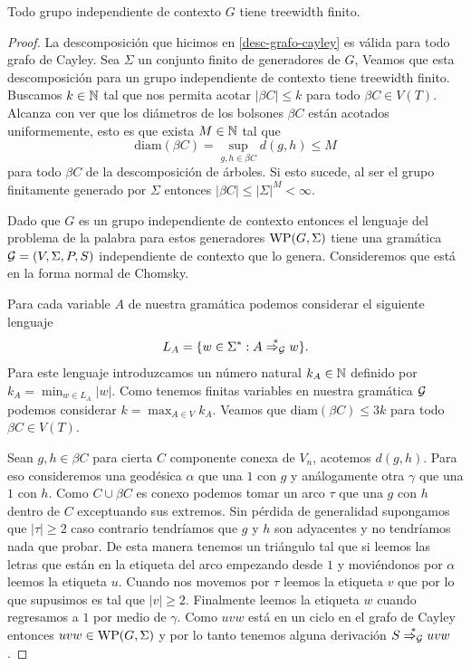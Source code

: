 \documentclass[tesis.tex]{subfiles}
\begin{document}
\begin{teo} \label{teo_Mul-Sch}\cite{muller1985theory}
	Todo grupo independiente de contexto $G$ tiene treewidth finito.
\end{teo}
\begin{proof}
	La descomposición que hicimos en \ref{desc-grafo-cayley} es válida para todo grafo de Cayley.
	Sea $\Sigma$ un conjunto finito de generadores de $G$, 
	Veamos que esta descomposición para un grupo independiente de contexto tiene treewidth finito. 
	Buscamos $k \in \mathbb{N}$ tal que nos permita acotar $|\beta C| \le k$ para todo $\beta C \in V(T)$. 
	Alcanza con ver que los diámetros de los bolsones $\beta C$ están acotados uniformemente, 
	esto es que exista $M \in \mathbb{N}$ tal que 
	\[
	\text{diam}(\beta C) =  \sup_{g,h \in \beta C} d(g,h) \le M
	\] 
	para todo $\beta C$ de la descomposición de árboles.
	Si esto sucede, al ser el grupo finitamente generado por $\Sigma$ entonces $|\beta C| \le |\Sigma|^{M} < \infty$.
	
	
	Dado que $G$ es un grupo independiente de contexto entonces el lenguaje del problema de la palabra para estos generadores $\text{WP}(G, \Sigma)$ tiene una gramática $ {\cal G} = (V, \Sigma, P, S)$ independiente de contexto que lo genera. 
	Consideremos que está en la forma normal de Chomsky.
	
	Para cada variable $A$ de nuestra gramática podemos considerar el siguiente lenguaje
	\[
	L_A = \{ w \in \Sigma^* : A \overset{*}{\Rightarrow_{\cal G}} w  \}.
	\]
	Para este lenguaje introduzcamos un número natural $k_A \in \mathbb{N}$ definido por $k_A = {\min}_{w \in L_A} |w|$. 
	Como tenemos finitas variables en nuestra gramática $\cal G$ podemos considerar $k = \max_{A \in V} k_A$. 
	Veamos que $\text{diam}(\beta C) \le 3k$ para todo $\beta C \in V(T)$.
	
	Sean $g,h \in \beta C$ para cierta $C$ componente conexa de $V_n$, acotemos $d(g,h)$. 
	Para eso consideremos una geodésica $\alpha$ que una $1$ con $g$ y análogamente otra $\gamma$ que una $1$ con $h$. 
	Como $C \cup \beta C$ es conexo podemos tomar un arco $\tau$ que una $g$ con  $h$ dentro de $C$ exceptuando sus extremos. 
	Sin pérdida de generalidad supongamos que $|\tau| \ge 2$ caso contrario tendríamos que $g$ y $h$ son adyacentes y no tendríamos nada que probar.
	De esta manera tenemos un triángulo tal que si leemos las letras que están en la etiqueta del arco empezando desde $1$ y moviéndonos por $\alpha$ leemos la etiqueta $u$. 
	Cuando nos movemos por $\tau$ leemos la etiqueta $v$ que por lo que supusimos es tal que $|v| \ge 2$. 
	Finalmente leemos la etiqueta $w$ cuando regresamos a $1$ por medio de $\gamma$.
	Como $uvw$ está en un ciclo en el grafo de Cayley entonces $uvw \in  \text{WP}(G, \Sigma)$ y por lo tanto tenemos alguna derivación $S \overset{*}{\Rightarrow_{\cal G}} uvw$.
	

\end{proof}
\end{document}
